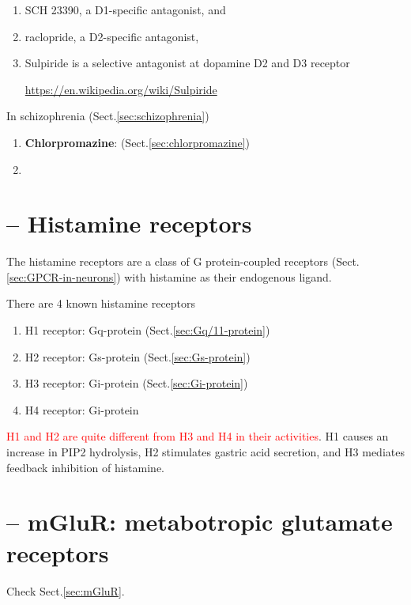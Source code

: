 \begin{enumerate}
  \item  SCH 23390, a D1-specific antagonist, and 
  
  \item raclopride, a D2-specific antagonist,
  
  \item Sulpiride is a selective antagonist at dopamine D2 and D3 receptor

  
\url{https://en.wikipedia.org/wiki/Sulpiride}
\end{enumerate}


In schizophrenia (Sect.\ref{sec:schizophrenia})
\begin{enumerate}
  \item {\bf Chlorpromazine}:  (Sect.\ref{sec:chlorpromazine})
  
  \item 
\end{enumerate}


\section{ -- Histamine receptors}
\label{sec:histamine-receptors}

The histamine receptors are a class of G protein-coupled receptors
(Sect.\ref{sec:GPCR-in-neurons}) with histamine as their endogenous ligand.

There are 4 known histamine receptors
\begin{enumerate}
  \item H1 receptor: Gq-protein (Sect.\ref{sec:Gq/11-protein})
  \item H2 receptor: Gs-protein (Sect.\ref{sec:Gs-protein})
  \item H3 receptor: Gi-protein (Sect.\ref{sec:Gi-protein})
  
  \item H4 receptor: Gi-protein
\end{enumerate}

 \textcolor{red}{H1 and H2 are quite different from H3 and H4 in their
 activities}. H1 causes an increase in PIP2 hydrolysis, H2 stimulates gastric
 acid secretion, and H3 mediates feedback inhibition of histamine.
 
\section{ -- mGluR: metabotropic glutamate receptors}

Check Sect.\ref{sec:mGluR}.
 

